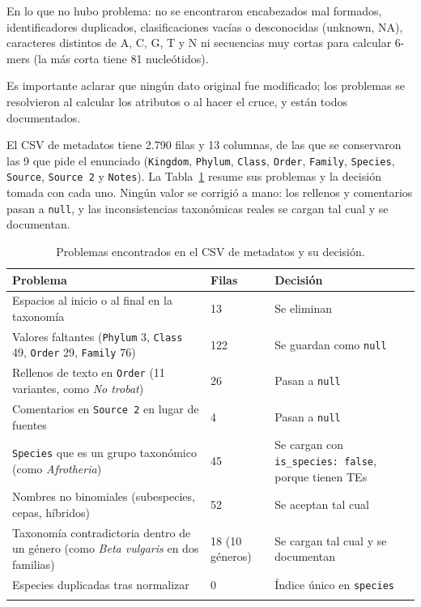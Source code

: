 \documentclass[unnumsec,namedate,webpdf,contemporary,large]{oup-authoring-template}
\begin{document}
En lo que no hubo problema: no se encontraron encabezados mal formados, identificadores duplicados, clasificaciones vac\'ias o desconocidas (unknown, NA), caracteres distintos de A, C, G, T y N ni secuencias muy cortas para calcular 6-mers (la m\'as corta tiene 81 nucle\'otidos).

Es importante aclarar que ning\'un dato original fue modificado; los problemas se resolvieron al calcular los atributos o al hacer el cruce, y est\'an todos documentados.

El CSV de metadatos tiene 2.790 filas y 13 columnas, de las que se conservaron las 9 que pide el enunciado (\texttt{Kingdom}, \texttt{Phylum}, \texttt{Class}, \texttt{Order}, \texttt{Family}, \texttt{Species}, \texttt{Source}, \texttt{Source 2} y \texttt{Notes}). La Tabla~\ref{tab:calidad_csv} resume sus problemas y la decisi\'on tomada con cada uno. Ning\'un valor se corrigi\'o a mano: los rellenos y comentarios pasan a \texttt{null}, y las inconsistencias taxon\'omicas reales se cargan tal cual y se documentan.

\begin{table}[!t]
\caption{Problemas encontrados en el CSV de metadatos y su decisi\'on.\label{tab:calidad_csv}}
\footnotesize
\begin{tabular}{@{}p{}p{}p{}@{}}
\toprule
Problema & Filas & Decisi\'on \\
\midrule
Espacios al inicio o al final en la taxonom\'ia & 13 & Se eliminan \\
Valores faltantes (\texttt{Phylum} 3, \texttt{Class} 49, \texttt{Order} 29, \texttt{Family} 76) & 122 & Se guardan como \texttt{null} \\
Rellenos de texto en \texttt{Order} (11 variantes, como \textit{No trobat}) & 26 & Pasan a \texttt{null} \\
Comentarios en \texttt{Source 2} en lugar de fuentes & 4 & Pasan a \texttt{null} \\
\texttt{Species} que es un grupo taxon\'omico (como \textit{Afrotheria}) & 45 & Se cargan con \texttt{is\_species: false}, porque tienen TEs \\
Nombres no binomiales (subespecies, cepas, h\'ibridos) & 52 & Se aceptan tal cual \\
Taxonom\'ia contradictoria dentro de un g\'enero (como \textit{Beta vulgaris} en dos familias) & 18 (10 g\'eneros) & Se cargan tal cual y se documentan \\
Especies duplicadas tras normalizar & 0 & \'Indice \'unico en \texttt{species} \\
\botrule
\end{tabular}
\end{table}
\end{document}
